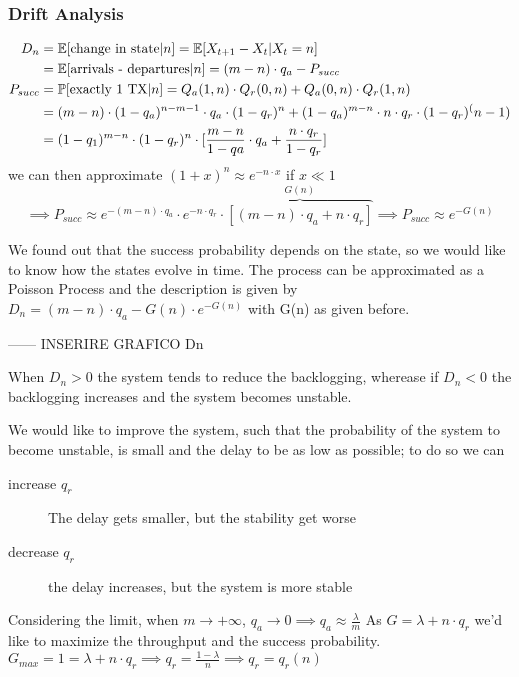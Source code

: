 \subsubsection{Drift Analysis}
\begin{equation}\begin{split}
  D_n &= \mathbb{E}[\text{change in state} | n] = \mathbb{E}[X_{t+1} - X_t | X_t = n] \\
  &= \mathbb{E}[\text{arrivals - departures} | n ] = (m-n) \cdot q_a - P_{succ} \\
  P_{succ}&= \mathbb{P}[\text{exactly 1 TX}|n] = Q_a(1,n) \cdot Q_r(0,n) + Q_a(0,n) \cdot Q_r(1,n) \\
  &= (m-n)\cdot(1-q_a)^{n-m-1} \cdot q_a \cdot(1-q_r)^n + (1-q_a)^{m-n}\cdot n \cdot q_r \cdot (1-q_r)^(n-1) \\
  &= (1-q_1)^{m-n} \cdot (1-q_r)^n \cdot [\frac{m-n}{1-qa}\cdot q_a + \frac{n \cdot q_r}{1-q_r}]
\end{split}\end{equation}
we can then approximate $(1+x)^n \approx e^{-n \cdot x}$ if $x \ll 1$
\begin{equation}
  \implies P_{succ} \approx e^{-(m-n)\cdot q_a} \cdot e^{-n\cdot q_r} \cdot \overbrace{[(m-n) \cdot q_a + n \cdot q_r]}^{G(n)}
  \implies P_{succ} \approx e^{-G(n)}
\end{equation}

We found out that the success probability depends on the state, so we would like to know how the states evolve in time.
The process can be approximated as a Poisson Process and the description is given by $D_n = (m-n)\cdot q_a - G(n) \cdot e^{-G(n)}$
with G(n) as given before.

------ INSERIRE GRAFICO Dn

When $D_n>0$ the system tends to reduce the backlogging, wherease if $D_n<0$ the backlogging
increases and the system becomes unstable.

We would like to improve the system, such that the probability of the system to become
unstable, is small and the delay to be as low as possible; to do so we can
\begin{description}
  \item[increase $q_r$] The delay gets smaller, but the stability get worse
  \item[decrease $q_r$] the delay increases, but the system is more stable
\end{description}

Considering the limit, when $m \to +\infty$, $q_a \to 0 \implies q_a \approx \frac{\lambda}{m}$
As $G=\lambda + n \cdot q_r$ we'd like to maximize the throughput and the success probability.
$G_{max}=1 = \lambda + n  \cdot q_r \implies q_r = \frac{1-\lambda}{n} \implies q_r = q_r(n)$

